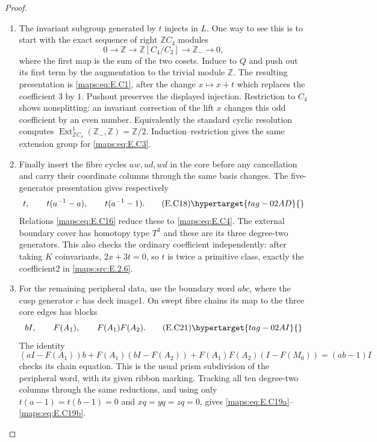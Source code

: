 \begin{proof}
\begin{enumerate}[label={$\langle1\rangle$\arabic*.},leftmargin=*]
\item The invariant subgroup generated by $t$ injects in
$L$. One way to see this is to start with the exact
sequence of right $\mathbb ZC_4$ modules
\[
 0\longrightarrow\mathbb Z\longrightarrow
 \mathbb Z[C_4/C_2]\longrightarrow\mathbb Z_-\longrightarrow0,
\]
where the first map is the sum of the two cosets.
Induce to $Q$ and push out its first term by the
augmentation to the trivial module $\mathbb Z$.
The resulting presentation is \eqref{maps:eq:E.C1}, after the
change $x\mapsto x+t$ which replaces the coefficient
$3$ by $1$. Pushout preserves the displayed injection.
Restriction to $C_4$ shows nonsplitting: an invariant
correction of the lift $x$ changes this odd coefficient
by an even number. Equivalently the standard cyclic
resolution computes
$\operatorname{Ext}^1_{\mathbb ZC_4}(\mathbb Z_-,\mathbb Z)
=\mathbb Z/2$. Induction--restriction gives the same
extension group for \eqref{maps:eq:E.C3}.

\item Finally insert the fibre cycles $uw,ud,wd$ in
the core before any cancellation and carry their
coordinate columns through the same basis changes.
The five-generator presentation gives respectively
\[
 t,\qquad t(a^{-1}-a),\qquad t(a^{-1}-1).
 \tag{E.C18}\hypertarget{tag-02AD}{}\label{maps:eq:E.C18}
\]
Relations \eqref{maps:eq:E.C16} reduce these to \eqref{maps:eq:E.C4}. The external
boundary cover has homotopy type $T^3$ and these are
its three degree-two generators. This also checks
the ordinary coefficient independently: after taking
$K$ coinvariants, $2x+3t=0$, so $t$ is twice a
primitive class, exactly the coefficient2 in \ref{maps:src:E.2.6}.

\item For the remaining peripheral data, use the
boundary word $abc$, where the cusp generator $c$
has deck image1. On swept fibre chains its map to
the three core edges has blocks
\[
                 bI,\qquad F(A_1),\qquad F(A_1)F(A_2).
 \tag{E.C21}\hypertarget{tag-02AI}{}\label{maps:eq:E.C21}
\]
The identity
\[
 (aI-F(A_1))b+F(A_1)(bI-F(A_2))
       +F(A_1)F(A_2)(I-F(M_0))=(ab-1)I
\]
checks its chain equation. This is the usual prism
subdivision of the peripheral word, with
its given ribbon marking. Tracking all ten
degree-two columns through the same reductions,
and using only $t(a-1)=t(b-1)=0$ and
$xq=yq=zq=0$, gives \eqref{maps:eq:E.C19a}--\eqref{maps:eq:E.C19b}.

\end{enumerate}
\end{proof}

